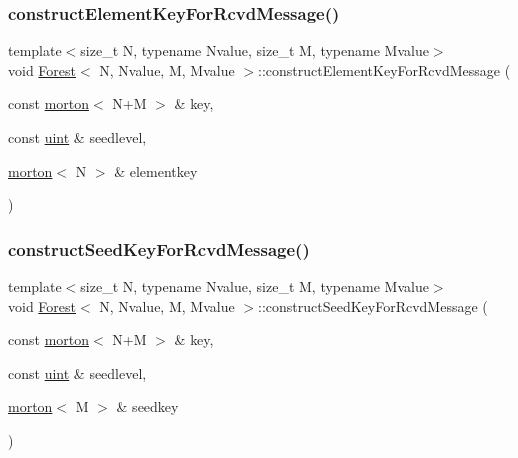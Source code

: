 \subsubsection{\texorpdfstring{construct\+Element\+Key\+For\+Rcvd\+Message()}{constructElementKeyForRcvdMessage()}}
{\footnotesize\ttfamily template$<$size\+\_\+t N, typename Nvalue, size\+\_\+t M, typename Mvalue$>$ \\
void \mbox{\hyperlink{classForest}{Forest}}$<$ N, Nvalue, M, Mvalue $>$\+::construct\+Element\+Key\+For\+Rcvd\+Message (\begin{DoxyParamCaption}\item[{const \mbox{\hyperlink{definitions_8h_af8682350bd8bb38ee9023f7a0a310add}{morton}}$<$ N+M $>$ \&}]{key,  }\item[{const \mbox{\hyperlink{definitions_8h_a69aa29b598b851b0640aa225a9e5d61d}{uint}} \&}]{seedlevel,  }\item[{\mbox{\hyperlink{definitions_8h_af8682350bd8bb38ee9023f7a0a310add}{morton}}$<$ N $>$ \&}]{elementkey }\end{DoxyParamCaption})}

\mbox{\label{classForest_a2269d0888420a7d167a120919c83eff0}} 
\subsubsection{\texorpdfstring{construct\+Seed\+Key\+For\+Rcvd\+Message()}{constructSeedKeyForRcvdMessage()}}
{\footnotesize\ttfamily template$<$size\+\_\+t N, typename Nvalue, size\+\_\+t M, typename Mvalue$>$ \\
void \mbox{\hyperlink{classForest}{Forest}}$<$ N, Nvalue, M, Mvalue $>$\+::construct\+Seed\+Key\+For\+Rcvd\+Message (\begin{DoxyParamCaption}\item[{const \mbox{\hyperlink{definitions_8h_af8682350bd8bb38ee9023f7a0a310add}{morton}}$<$ N+M $>$ \&}]{key,  }\item[{const \mbox{\hyperlink{definitions_8h_a69aa29b598b851b0640aa225a9e5d61d}{uint}} \&}]{seedlevel,  }\item[{\mbox{\hyperlink{definitions_8h_af8682350bd8bb38ee9023f7a0a310add}{morton}}$<$ M $>$ \&}]{seedkey }\end{DoxyParamCaption})}

